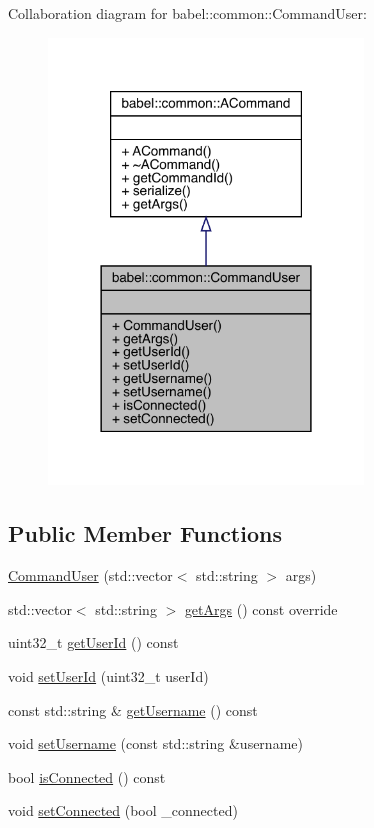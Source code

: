Collaboration diagram for babel\+:\+:common\+:\+:Command\+User\+:\nopagebreak
\begin{figure}[H]
\begin{center}
\leavevmode
\includegraphics[width=237pt]{classbabel_1_1common_1_1_command_user__coll__graph}
\end{center}
\end{figure}
\subsection*{Public Member Functions}
\begin{DoxyCompactItemize}
\item 
\mbox{\hyperlink{classbabel_1_1common_1_1_command_user_a25ad5bc375d017433d007caece14723b}{Command\+User}} (std\+::vector$<$ std\+::string $>$ args)
\item 
std\+::vector$<$ std\+::string $>$ \mbox{\hyperlink{classbabel_1_1common_1_1_command_user_ac23ded08ec9e57e2a5f3c7374d9fa232}{get\+Args}} () const override
\item 
uint32\+\_\+t \mbox{\hyperlink{classbabel_1_1common_1_1_command_user_a2ac1c73e308b0b9aeba34a7bedc1f523}{get\+User\+Id}} () const
\item 
void \mbox{\hyperlink{classbabel_1_1common_1_1_command_user_a9ab2ea2584246c996e634838ee0f6444}{set\+User\+Id}} (uint32\+\_\+t user\+Id)
\item 
const std\+::string \& \mbox{\hyperlink{classbabel_1_1common_1_1_command_user_a05341a4195670e9f300ca12efad551d2}{get\+Username}} () const
\item 
void \mbox{\hyperlink{classbabel_1_1common_1_1_command_user_afd950c8ec500ff9a40de2d0a8d9b9144}{set\+Username}} (const std\+::string \&username)
\item 
bool \mbox{\hyperlink{classbabel_1_1common_1_1_command_user_acec49179dacd6427aed9516ef9603700}{is\+Connected}} () const
\item 
void \mbox{\hyperlink{classbabel_1_1common_1_1_command_user_ab591e093d01b3fa143d2ef45dd9243f9}{set\+Connected}} (bool \+\_\+connected)
\end{DoxyCompactItemize}


